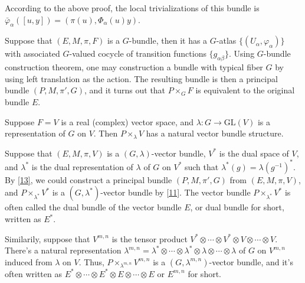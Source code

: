 According to the above proof, the local trivializations of this bundle is $\bar{\varphi}_\alpha([u,y])=(\pi(u),\Phi_\alpha(u)y)$.

\begin{para}\label{13}
	Suppose that $(E,M,\pi,F)$ is a $G$-bundle, then it has a $G$-atlas $\{(U_\alpha,\varphi_\alpha)\}$ with associated $G$-valued cocycle of transition functions $\{g_{\alpha\beta}\}$. Using $G$-bundle construction theorem, one may construction a bundle with typical fiber $G$ by using left translation as the action. The resulting bundle is then a principal bundle $(P,M,\pi',G)$, and it turns out that $P\times_G F$ is equivalent to the original bundle $E$.
\end{para}

\begin{para}
	Suppose $F=V$ is a real (complex) vector space, and $\lambda:G\to \mathrm{GL}(V)$ is a representation of $G$ on $V$. Then $P\times_\lambda V$ has a natural vector bundle structure.
\end{para}

\begin{para}
	Suppose that $(E,M,\pi,V)$ is a $(G,\lambda)$-vector bundle, $V^*$ is the dual space of $V$, and $\lambda^*$ is the dual representation of $\lambda$ of $G$ on $V^*$ such that $\lambda^*(g)=\lambda(g^{-1})^*$. By \ref{13}, we could construct a principal bundle $(P,M,\pi',G)$ from $(E,M,\pi,V)$, and $P\times_{\lambda^*} V^*$ is a $(G,\lambda^*)$-vector bundle by \ref{11}. The vector bundle $P\times_{\lambda^*} V^*$ is often called the dual bundle of the vector bundle $E$, or dual bundle for short, written as $E^*$.
\end{para}

Similarily, suppose that $V^{m,n}$ is the tensor product $V^*\otimes \cdots \otimes V^*\otimes V \otimes \cdots \otimes V$. There's a natural representation $\lambda^{m,n}=\lambda^*\otimes \cdots \otimes \lambda^*\otimes \lambda \otimes \cdots \otimes \lambda$ of $G$ on $V^{m,n}$ induced from $\lambda$ on $V$. Thus, $P\times_{\lambda^{m,n}} V^{m,n}$ is a $(G,\lambda^{m,n})$-vector bundle, and it's often written as $E^*\otimes \cdots \otimes E^*\otimes E \otimes \cdots \otimes E$ or $E^{m,n}$ for short.


